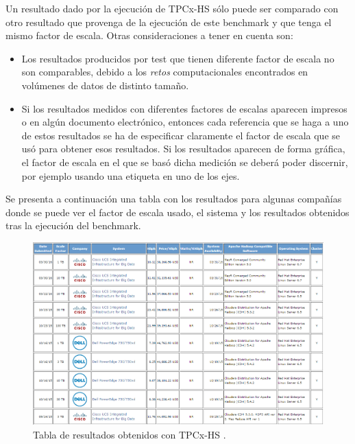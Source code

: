 \documentclass[10pt]{article}
\begin{document}
		Un resultado dado por la ejecución de TPCx-HS sólo puede ser comparado con otro resultado que provenga de la ejecución de este benchmark y que tenga el mismo factor de escala. Otras consideraciones a tener en cuenta son:
		
		\begin{itemize}
			\item Los resultados producidos por test que tienen diferente factor de escala no son comparables, debido a los \textit{retos} computacionales encontrados en volúmenes de datos de distinto tamaño.
			\item Si los resultados medidos con diferentes factores de escalas aparecen impresos o en algún documento electrónico, entonces cada referencia que se haga a uno de estos resultados se ha de especificar claramente el factor de escala que se usó para obtener esos resultados. Si los resultados aparecen de forma gráfica, el factor de escala en el que se basó dicha medición se deberá poder discernir, por ejemplo usando una etiqueta en uno de los ejes.
		\end{itemize}
		
		
		Se presenta a continuación una tabla con los resultados para algunas compañías donde se puede ver el factor de escala usado, el sistema y los resultados obtenidos tras la ejecución del benchmark.
		
		\begin{figure}[H]
			\centering
			\includegraphics[width=15cm]{./images/examples.png}
			\caption{Tabla de resultados obtenidos con TPCx-HS \cite{ejemplos}.} 
			\label{fig:ejemplo}
		\end{figure}

\end{document}
